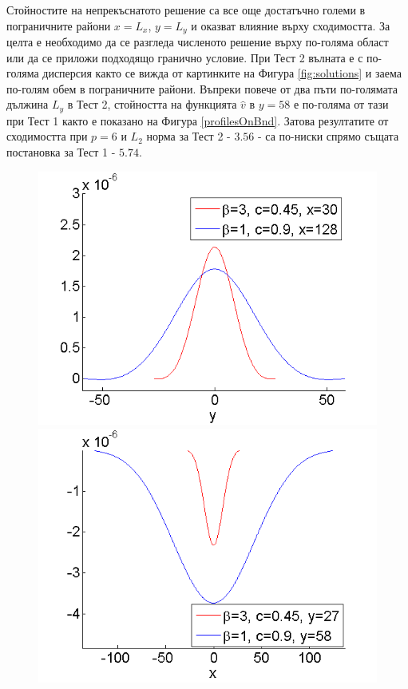 \documentclass[a4paper]{article}
\theoremstyle{remark}
\begin{document}
\begin{large}
\iffalse
 Стойностите на непрекъснатото решение са все още достатъчно големи в пограничните райони $x=L_x$, $y=L_y$ и оказват влияние върху сходимостта. За целта е необходимо да се разгледа численото решение върху по-голяма област или да се приложи подходящо гранично условие. При Тест 2 вълната е с по-голяма дисперсия както се вижда от картинките на Фигура \ref{fig:solutions} и заема по-голям обем в пограничните райони. Въпреки повече от два пъти по-голямата дължина $L_y$ в Тест 2, стойността на функцията $\widehat v$ в $y=58$ е по-голяма от тази при Тест 1 както е показано на Фигура \ref{profilesOnBnd}. Затова резултатите от сходимостта при $p=6$ и $L_2$ норма за Тест 2 - $3.56$ - са по-ниски спрямо същата постановка за Тест 1 - $5.74$.
\begin{figure}[ht]
	\begin{minipage}[b]{0.5\linewidth}
		\raggedleft
		\includegraphics[width=\linewidth]{SolutionView/ChristovIC_128vsChristov_30on_xEnd.png}
	\end{minipage}	
	\begin{minipage}[b]{0.5\linewidth}
		\raggedright
		 \includegraphics[width=\linewidth]{SolutionView/ChristovIC_128vsChristov_30on_yEnd.png}

\end{minipage}
\end{figure}
\end{large}
\end{document}
